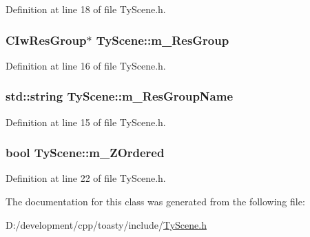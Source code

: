 Definition at line 18 of file TyScene.h.

\hypertarget{class_ty_scene_abb64484343fc018c448facb6df37c45e}{
\subsubsection[{m\_\-ResGroup}]{\setlength{\rightskip}{0pt plus 5cm}CIwResGroup$\ast$ {\bf TyScene::m\_\-ResGroup}}}
\label{class_ty_scene_abb64484343fc018c448facb6df37c45e}


Definition at line 16 of file TyScene.h.

\hypertarget{class_ty_scene_aea0b3d468bd83b94ee663c5a10e2e7cf}{
\subsubsection[{m\_\-ResGroupName}]{\setlength{\rightskip}{0pt plus 5cm}std::string {\bf TyScene::m\_\-ResGroupName}}}
\label{class_ty_scene_aea0b3d468bd83b94ee663c5a10e2e7cf}


Definition at line 15 of file TyScene.h.

\hypertarget{class_ty_scene_aa23591667f1d19ae881d2ed9de96414f}{
\subsubsection[{m\_\-ZOrdered}]{\setlength{\rightskip}{0pt plus 5cm}bool {\bf TyScene::m\_\-ZOrdered}}}
\label{class_ty_scene_aa23591667f1d19ae881d2ed9de96414f}


Definition at line 22 of file TyScene.h.



The documentation for this class was generated from the following file:\begin{DoxyCompactItemize}
\item 
D:/development/cpp/toasty/include/\hyperlink{_ty_scene_8h}{TyScene.h}\end{DoxyCompactItemize}
